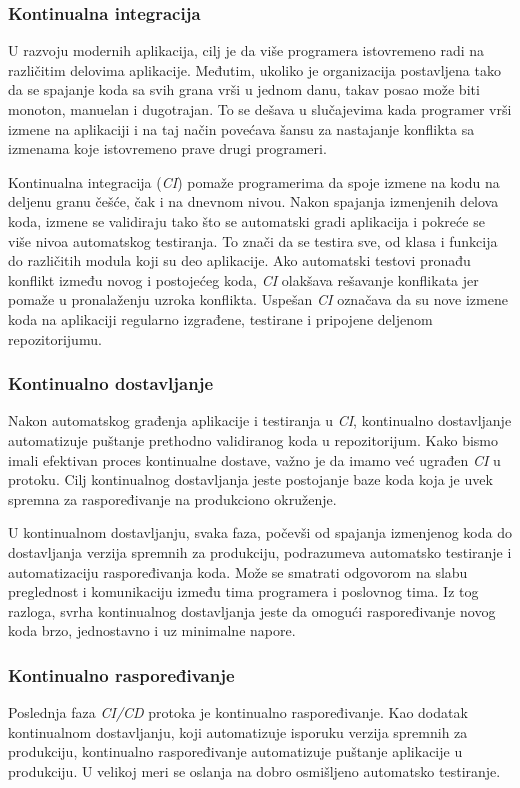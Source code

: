 \subsubsection{Kontinualna integracija}
U razvoju modernih aplikacija, cilj je da više programera istovremeno radi na različitim delovima 
aplikacije. Međutim, ukoliko je organizacija postavljena tako da se spajanje koda sa svih grana 
vrši u jednom danu, takav posao može biti monoton, manuelan i dugotrajan. To se dešava u slučajevima 
kada programer vrši izmene na aplikaciji i na taj način povećava šansu za nastajanje konflikta sa 
izmenama koje istovremeno prave drugi programeri.

Kontinualna integracija (\textit{CI}) pomaže programerima da spoje izmene na kodu na deljenu granu češće, 
čak i na dnevnom nivou. Nakon spajanja izmenjenih delova koda, izmene se validiraju tako što se 
automatski gradi aplikacija i pokreće se više nivoa automatskog testiranja. To znači da se testira 
sve, od klasa i funkcija do različitih modula koji su deo aplikacije. Ako automatski testovi pronađu 
konflikt između novog i postojećeg koda, \textit{CI} olakšava rešavanje konflikata jer pomaže u 
pronalaženju uzroka konflikta. Uspešan \textit{CI} označava da su nove izmene koda 
na aplikaciji regularno izgrađene, testirane i pripojene deljenom repozitorijumu.

\subsubsection{Kontinualno dostavljanje}
Nakon automatskog građenja aplikacije i testiranja u \textit{CI}, kontinualno dostavljanje automatizuje 
puštanje prethodno validiranog koda u repozitorijum. Kako bismo imali efektivan proces kontinualne 
dostave, važno je da imamo već ugrađen \textit{CI} u protoku. Cilj kontinualnog dostavljanja jeste postojanje 
baze koda koja je uvek spremna za raspoređivanje na produkciono okruženje.

U kontinualnom dostavljanju, svaka faza, počevši od spajanja izmenjenog koda do dostavljanja 
verzija spremnih za produkciju, podrazumeva automatsko testiranje i automatizaciju raspoređivanja 
koda. Može se smatrati odgovorom na slabu preglednost i komunikaciju između tima 
programera i poslovnog tima. Iz tog razloga, svrha kontinualnog dostavljanja jeste da omogući 
raspoređivanje novog koda brzo, jednostavno i uz minimalne napore.

\subsubsection{Kontinualno raspoređivanje}
Poslednja faza \textit{CI/CD} protoka je kontinualno raspoređivanje. Kao dodatak kontinualnom dostavljanju, 
koji automatizuje isporuku verzija spremnih za produkciju, kontinualno raspoređivanje automatizuje 
puštanje aplikacije u produkciju. U velikoj meri se oslanja na dobro osmišljeno automatsko testiranje.

